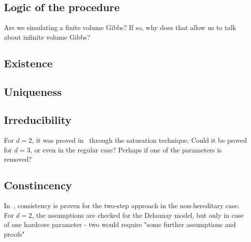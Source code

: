 \documentclass[12pt,a4paper]{report}
\begin{document}
\subsection{Logic of the procedure}
Are we simulating a finite volume Gibbs? If so, why does that allow us to talk about infinite volume Gibbs? 
\subsection{Existence}

\subsection{Uniqueness}

\subsection{Irreducibility}
For $d=2$, it was proved in~\cite{DL10} through the saturation technique. Could it be proved for $d=3$, or even in the regular case? Perhaps if one of the parameters is removed?
\subsection{Constincency}
In~\cite{DL07}, consistency is proven for the two-step approach in the non-hereditary case. For $d=2$, the assumptions are checked for the Delaunay model, but only in case of one hardcore parameter - two would require "some further assumptions and proofs"
\end{document}
